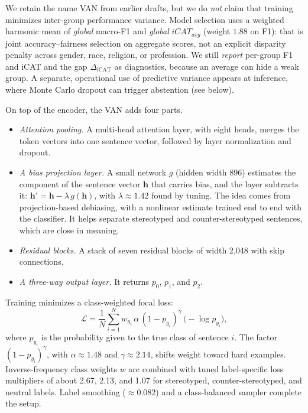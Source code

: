 \documentclass{IEEEcsmag}
\begin{document}
We retain the name VAN from earlier drafts, but we do \emph{not} claim that training minimizes inter-group performance variance. Model selection uses a weighted harmonic mean of \emph{global} macro-F1 and \emph{global} $\mathit{iCAT_{avg}}$ (weight $1.88$ on F1): that is joint accuracy--fairness selection on aggregate scores, not an explicit disparity penalty across gender, race, religion, or profession. We still \emph{report} per-group F1 and iCAT and the gap $\Delta_{\mathrm{iCAT}}$ as diagnostics, because an average can hide a weak group. A separate, operational use of predictive variance appears at inference, where Monte Carlo dropout can trigger abstention (see below).

On top of the encoder, the VAN adds four parts.
\begin{itemize}
\item[{\ieeeguilsinglright}] {\it Attention pooling.} A multi-head attention layer, with eight heads, merges the token vectors into one sentence vector, followed by layer normalization and dropout.
\item[{\ieeeguilsinglright}] {\it A bias projection layer.} A small network $g$ (hidden width 896) estimates the component of the sentence vector $\mathbf{h}$ that carries bias, and the layer subtracts it: $\mathbf{h}' = \mathbf{h} - \lambda\, g(\mathbf{h})$, with $\lambda\approx 1.42$ found by tuning. The idea comes from projection-based debiasing,\cite{ravfogel2020} with a nonlinear estimate trained end to end with the classifier. It helps separate stereotyped and counter-stereotyped sentences, which are close in meaning.
\item[{\ieeeguilsinglright}] {\it Residual blocks.} A stack of seven residual blocks of width 2{,}048 with skip connections.
\item[{\ieeeguilsinglright}] {\it A three-way output layer.} It returns $p_0$, $p_1$, and $p_2$.
\end{itemize}

Training minimizes a class-weighted focal loss:\cite{lin2017}
\begin{equation}
\mathcal{L} = \frac{1}{N}\sum_{i=1}^{N} w_{y_i}\,\alpha\,(1-p_{y_i})^{\gamma}\,\bigl(-\log p_{y_i}\bigr),
\end{equation}
where $p_{y_i}$ is the probability given to the true class of sentence $i$. The factor $(1-p_{y_i})^{\gamma}$, with $\alpha\approx 1.48$ and $\gamma\approx 2.14$, shifts weight toward hard examples. Inverse-frequency class weights $w$ are combined with tuned label-specific loss multipliers of about 2.67, 2.13, and 1.07 for stereotyped, counter-stereotyped, and neutral labels. Label smoothing ($\approx 0.082$) and a class-balanced sampler complete the setup.
\end{document}

